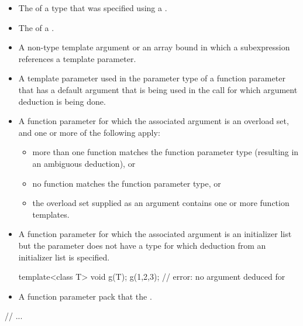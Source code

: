 \documentclass{wg21}
\begin{document}
%
\begin{itemize}
\item
The
of a type that was specified using a
.
\item
The  of a .
\item
A non-type template argument or an array bound in which a subexpression
references a template parameter.
\item
A template parameter used in the parameter type of a function parameter that
has a default argument that is being used in the call for which argument
deduction is being done.
\item
A function parameter for which the associated argument is an
overload set, and one or more of the following apply:
\begin{itemize}
    \item
    more than one function matches the function parameter type (resulting in
    an ambiguous deduction), or
    \item
    no function matches the function parameter type, or
    \item
    the overload set supplied as an argument contains one or more function templates.
\end{itemize}
\item A function parameter for which the associated argument is an initializer
list but the parameter does not have
a type for which deduction from an initializer list is specified.
\begin{example}
    \begin{codeblock}
        template<class T> void g(T);
        g({1,2,3});                 // error: no argument deduced for 
    \end{codeblock}
\end{example}
\item A function parameter pack that  the .
\end{itemize}

// ...

\pnum

\end{document}
